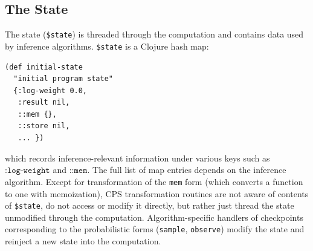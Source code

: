 \documentclass[preprint]{sigplanconf}
\begin{document}
\subsection {The State}
\label{sec:state}

The state (\texttt{\$state}) is threaded through the computation
and contains data used by inference algorithms. \texttt{\$state}
is a Clojure hash map:
\begin{lstlisting}[style=default]
(def initial-state
  "initial program state"
  {:log-weight 0.0,
   :result nil,
   ::mem {},
   ::store nil,
   ... })
\end{lstlisting}
which records inference-relevant information under various keys
such as $\texttt{:log-weight}$ and $\texttt{::mem}$.
The full list of map entries depends on the inference
algorithm. Except for transformation of
the \texttt{mem} form (which converts a function to one with memoization), 
CPS transformation routines
are not aware of contents of \texttt{\$state}, do not access or
modify it directly, but rather just thread the state unmodified
through the computation. Algorithm-specific handlers of
checkpoints corresponding to the probabilistic forms
(\texttt{sample}, \texttt{observe}) modify the
state and reinject a new state into the computation.
\end{document}
